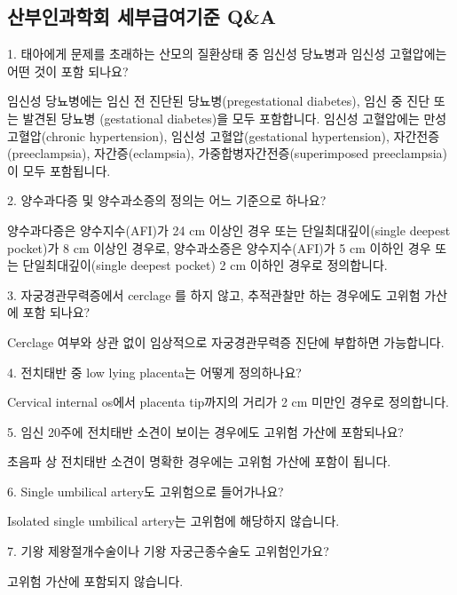 \subsection{산부인과학회 세부급여기준 Q\&A}
\prezi{\clearpage}
1. 태아에게 문제를 초래하는 산모의 질환상태 중 임신성 당뇨병과 임신성 고혈압에는 어떤 것이 포함 되나요?
\begin{quotebox}
임신성 당뇨병에는 임신 전 진단된 당뇨병(pregestational diabetes), 임신 중 진단 또는 발견된 당뇨병 (gestational diabetes)을 모두 포함합니다.
임신성 고혈압에는 만성고혈압(chronic hypertension), 임신성 고혈압(gestational hypertension), 자간전증 (preeclampsia), 자간증(eclampsia), 가중합병자간전증(superimposed preeclampsia)이 모두 포함됩니다.
\end{quotebox}
\prezi{\clearpage}
2. 양수과다증 및 양수과소증의 정의는 어느 기준으로 하나요?
\begin{quotebox}
양수과다증은 양수지수(AFI)가 24 cm 이상인 경우 또는 단일최대깊이(single deepest pocket)가 8 cm 이상인 경우로, 양수과소증은 양수지수(AFI)가 5 cm 이하인 경우 또는 단일최대깊이(single deepest pocket)
2 cm 이하인 경우로 정의합니다.
\end{quotebox}
\prezi{\clearpage}
3. 자궁경관무력증에서 cerclage 를 하지 않고, 추적관찰만 하는 경우에도 고위험 가산에 포함 되나요?
\begin{quotebox}
Cerclage 여부와 상관 없이 임상적으로 자궁경관무력증 진단에 부합하면 가능합니다.
\end{quotebox}
\prezi{\clearpage}
4. 전치태반 중 low lying placenta는 어떻게 정의하나요?
\begin{quotebox}
Cervical internal os에서 placenta tip까지의 거리가 2 cm 미만인 경우로 정의합니다.
\end{quotebox}
\prezi{\clearpage}
5. 임신 20주에 전치태반 소견이 보이는 경우에도 고위험 가산에 포함되나요?
\begin{quotebox}
초음파 상 전치태반 소견이 명확한 경우에는 고위험 가산에 포함이 됩니다.
\end{quotebox}
\prezi{\clearpage}
6. Single umbilical artery도 고위험으로 들어가나요?
\begin{quotebox}
Isolated single umbilical artery는 고위험에 해당하지 않습니다.
\end{quotebox}
\prezi{\clearpage}
7. 기왕 제왕절개수술이나 기왕 자궁근종수술도 고위험인가요?
\begin{quotebox}
고위험 가산에 포함되지 않습니다.
\end{quotebox}
